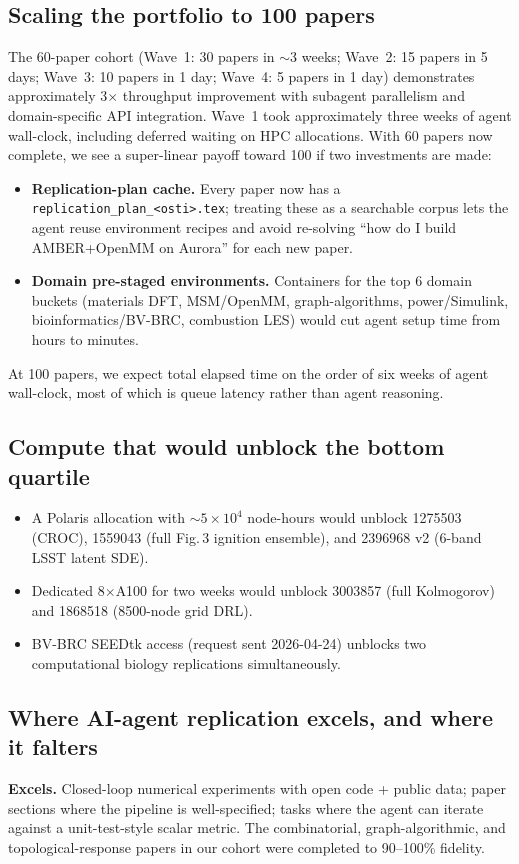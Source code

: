 \documentclass[11pt]{article}
\begin{document}
\subsection{Scaling the portfolio to 100 papers}
The 60-paper cohort (Wave~1: 30 papers in $\sim$3 weeks; Wave~2: 15 papers in 5 days; Wave~3: 10 papers in 1 day; Wave~4: 5 papers in 1 day) demonstrates approximately 3$\times$ throughput improvement with subagent parallelism and domain-specific API integration. Wave~1 took approximately three weeks of agent wall-clock,
including deferred waiting on HPC allocations. With 60 papers now complete,
we see a super-linear payoff toward 100 if two
investments are made:
\begin{itemize}
\item \textbf{Replication-plan cache.} Every paper now has a
\texttt{replication\_plan\_<osti>.tex}; treating these as a searchable corpus
lets the agent reuse environment recipes and avoid re-solving ``how do I build
AMBER+OpenMM on Aurora'' for each new paper.
\item \textbf{Domain pre-staged environments.} Containers for the top 6 domain
buckets (materials DFT, MSM/OpenMM, graph-algorithms, power/Simulink,
bioinformatics/BV-BRC, combustion LES) would cut agent setup time from hours
to minutes.
\end{itemize}
At 100 papers, we expect total elapsed time on the order of six weeks of agent
wall-clock, most of which is queue latency rather than agent reasoning.

\subsection{Compute that would unblock the bottom quartile}
\begin{itemize}
\item A Polaris allocation with $\sim 5\times 10^4$ node-hours would unblock
1275503 (CROC), 1559043 (full Fig.\,3 ignition ensemble), and 2396968 v2
(6-band LSST latent SDE).
\item Dedicated 8$\times$A100 for two weeks would unblock 3003857
(full Kolmogorov) and 1868518 (8500-node grid DRL).
\item BV-BRC SEEDtk access (request sent 2026-04-24) unblocks two computational
biology replications simultaneously.
\end{itemize}

\subsection{Where AI-agent replication excels, and where it falters}
\textbf{Excels.} Closed-loop numerical experiments with open code + public
data; paper sections where the pipeline is well-specified; tasks where
the agent can iterate against a unit-test-style scalar metric. The
combinatorial, graph-algorithmic, and topological-response papers in our
cohort were completed to 90--100\% fidelity.
\end{document}
